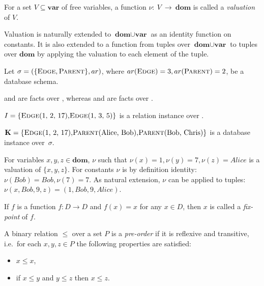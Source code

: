 \begin{defn}[Valuation]
For a set $V \subseteq \textbf{var}$ of free variables, a function $\nu:~V~\to~\textbf{dom}$ is called a \emph{valuation} of $V$. 
\end{defn}

Valuation is naturally extended to $\textbf{dom} \cup \textbf{var}$ as an identity function on constants. It is also extended to a function from tuples over $\textbf{dom} \cup \textbf{var}$ to tuples over $\textbf{dom}$ by applying the valuation to each element of the tuple.

\begin{exmp}
Let $\sigma = (\{\textsc{Edge}, \textsc{Parent}\}, ar)$, where  $ar(\textsc{Edge}) = 3, ar(\textsc{Parent}) = 2$, be a database schema. 

 and  are facts over , whereas  and  are facts over . 

$I = \{\relat{Edge}{(1, 2, 17)}, \relat{Edge}{(1, 3, 5)}\}$ is a relation instance over .

$\textbf{K} = \{\relat{Edge}{(1, 2, 17)}, \relat{Parent}{(Alice, Bob)}, \relat{Parent}{(Bob, Chris)}\}$ is a database instance over~$\sigma$.

For variables $x, y, z \in \textbf{dom}$, $\nu$ such that $\nu(x) = 1, \nu(y) = 7, \nu(z) = Alice$ is a valuation of $\{x, y, z\}$. For constants $\nu$ is by definition identity: $\nu(Bob) = Bob, \nu(7) = 7$. As natural extension, $\nu$ can be applied to tuples: $\nu(x, Bob, 9, z) = (1, Bob, 9, Alice)$.

\end{exmp}

\begin{defn}
If $f$ is a function $f: D \to D$ and $f(x) = x$ for any $x \in D$, then $x$ is called a \emph{fix-point} of $f$.
\end{defn}

\begin{defn}
A binary relation $\le$ over a set $P$ is a \emph{pre-order} if it is reflexive and transitive, i.e.\ for each $x, y, z \in P$ the following properties are satisfied:
\begin{itemize}
\item $x \le x$,
\item if $x \le y$ and $y \le z$ then $x \le z$.
\end{itemize}
\end{defn}

